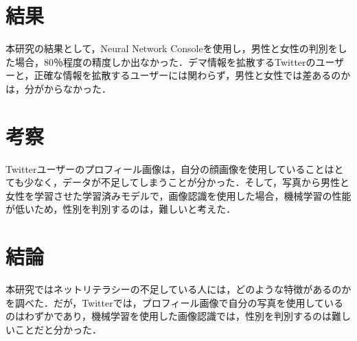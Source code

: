\documentclass[uplatex,twocolumn,dvipdfmx]{jsarticle}
\begin{document}
\section{結果}

本研究の結果として，Neural Network Consoleを使用し，男性と女性の判別をした場合，80％程度の精度しか出なかった．デマ情報を拡散するTwitterのユーザーと，正確な情報を拡散するユーザーには関わらず，男性と女性では差あるのかは，分がからなかった．

\section{考察}

Twitterユーザーのプロフィール画像は，自分の顔画像を使用していることはとても少なく，データが不足してしまうことが分かった．そして，写真から男性と女性を学習させた学習済みモデルで，画像認識を使用した場合，機械学習の性能が低いため，性別を判別するのは，難しいと考えた．

\section{結論}

本研究ではネットリテラシーの不足している人には，どのような特徴があるのかを調べた．だが，Twitterでは，プロフィール画像で自分の写真を使用しているのはわずかであり，機械学習を使用した画像認識では，性別を判別するのは難しいことだと分かった．

\end{document}
